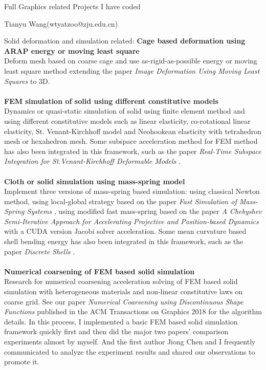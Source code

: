\documentclass{article} %
\begin{document}
%
\centerline{\large{Full Graphics related Projects I have coded}}
\vspace{2ex}
\centerline{\large{Tianyu Wang(wtyatzoo@zju.edu.cn)}}
\vspace{2ex}
\begin{section}{Solid deformation and simulation related:}
  {\bf Cage based deformation using ARAP energy or moving least square}\\Deform mesh based on coarse cage and use as-rigid-as-possible energy or moving least square method extending the paper \emph{Image Deformation Using Moving Least Squares} \cite{schaefer2006image} to 3D.\\
  \\{\bf FEM simulation of solid using different constitutive models}\\Dynamics or quasi-static simulation of solid using finite element method and using different constitutive models such as linear elasticity, co-rotational linear elasticity, St. Venant-Kirchhoff model and Neohookean elasticity with tetrahedron mesh or hexahedron mesh. Some subspace acceleration method for FEM method has also been integrated in this framework, such as the paper \textit{Real-Time Subspace Integration for St.Venant-Kirchhoff Deformable Models} \cite{barbivc2005real}. \\
  \\{\bf Cloth or solid simulation using mass-spring model}\\Implement three versions of mass-spring based simulation: using classical Newton method, using local-global strategy based on the paper \textit{Fast Simulation of Mass-Spring Systems} \cite{liu2013fast}, using modified fast mass-spring based on the paper \textit{A Chebyshev Semi-Iterative Approach for Accelerating Projective and Position-based Dynamics} \cite{wang2015chebyshev} with a CUDA version Jacobi solver acceleration. Some mean curvature based shell bending energy has also been integrated in this framework, such as the paper \textit{Discrete Shells} \cite{grinspun2003discrete}.\\
  \\{\bf Numerical coarsening of FEM based solid simulation}\\ Research for numerical coarsening acceleration solving of FEM based solid simulation with heterogeneous materials and non-linear constitutive laws on coarse grid. See our paper \emph{Numerical Coarsening using Discontinuous Shape Functions} \cite{chen2018numerical} published in the ACM Transactions on Graphics 2018 for the algorithm details. In this process, I implemented a basic FEM based solid simulation framework quickly first and then did the major two papers' comparison experiments almost by myself. And the first author Jiong Chen and I frequently communicated to analyze the experiment results and shared our observations to promote it.
\end{section}
\end{document}

